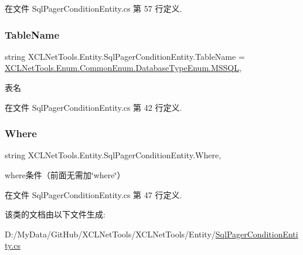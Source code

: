 在文件 Sql\+Pager\+Condition\+Entity.\+cs 第 57 行定义.

\mbox{\label{class_x_c_l_net_tools_1_1_entity_1_1_sql_pager_condition_entity_ac4a6c5b0eeef5c0ce63cd3aa15c91e15}} 
\subsubsection{\texorpdfstring{Table\+Name}{TableName}}
{\footnotesize\ttfamily string X\+C\+L\+Net\+Tools.\+Entity.\+Sql\+Pager\+Condition\+Entity.\+Table\+Name = \hyperlink{class_x_c_l_net_tools_1_1_enum_1_1_common_enum_a4c4edc085935542b75e6386cb261ab4ba1d37e2cfa8532be01d3f89c76ccfe4a9}{X\+C\+L\+Net\+Tools.\+Enum.\+Common\+Enum.\+Database\+Type\+Enum.\+M\+S\+S\+QL}\hspace{0.3cm}{\ttfamily [get]}, {\ttfamily [set]}}



表名 



在文件 Sql\+Pager\+Condition\+Entity.\+cs 第 42 行定义.

\mbox{\label{class_x_c_l_net_tools_1_1_entity_1_1_sql_pager_condition_entity_a0201ec19db112ae1787225c4e03a9b43}} 
\subsubsection{\texorpdfstring{Where}{Where}}
{\footnotesize\ttfamily string X\+C\+L\+Net\+Tools.\+Entity.\+Sql\+Pager\+Condition\+Entity.\+Where\hspace{0.3cm}{\ttfamily [get]}, {\ttfamily [set]}}



where条件（前面无需加\char`\"{}where\char`\"{}） 



在文件 Sql\+Pager\+Condition\+Entity.\+cs 第 47 行定义.



该类的文档由以下文件生成\+:\begin{DoxyCompactItemize}
\item 
D\+:/\+My\+Data/\+Git\+Hub/\+X\+C\+L\+Net\+Tools/\+X\+C\+L\+Net\+Tools/\+Entity/\hyperlink{_sql_pager_condition_entity_8cs}{Sql\+Pager\+Condition\+Entity.\+cs}\end{DoxyCompactItemize}

